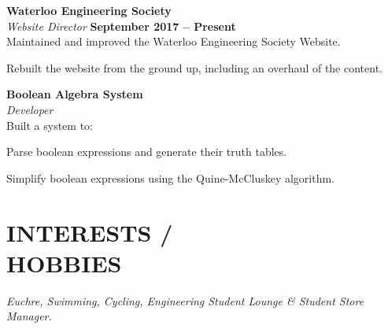 \documentclass[margin,line]{resume}
\begin{document}
\begin{resume}
    \textbf{\listing Waterloo Engineering Society} \vspace{2mm}\\\vspace{1mm}%
    \textsl{Website Director} \hfill \textbf{September 2017 -- Present}\\
    Maintained and improved the Waterloo Engineering Society Website. \\
    \begin{tightemize}
    \item Rebuilt the website from the ground up, including an overhaul of the content.
    \end{tightemize}

    \textbf{\listing Boolean Algebra System} \vspace{2mm}\\\vspace{1mm}%
    \textsl{Developer}\\
    Built a system to:\\
    \begin{tightemize}
    \item Parse boolean expressions and generate their truth tables.
    \item Simplify boolean expressions using the Quine-McCluskey algorithm.
    \end{tightemize}

\sectionline

    \section{\mysidestyle \textbf{\large{I}\small{NTERESTS  / \\ \large{H}\small{OBBIES}}}}

    \textsl{Euchre, Swimming, Cycling, Engineering Student Lounge \& Student Store Manager.}\\

\end{resume}
\end{document}
